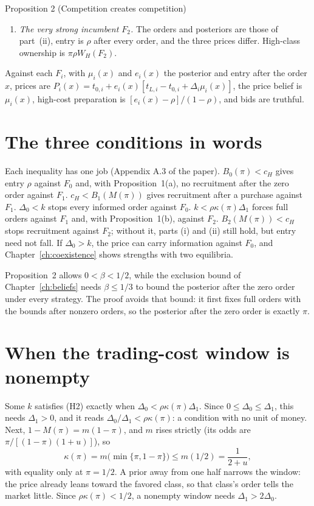 \begin{paperresult}{Proposition 2 (Competition creates competition)}
\begin{enumerate}[label=(\roman*),leftmargin=2em]
  \(W_L(F_0)=0\), that share is one against both incumbents.
\item \emph{The very strong incumbent \(F_2\).} The orders and posteriors are those of part~(ii), entry is \(\rho\)
  after every order, and the three prices differ. High-class ownership is \(\pi\rho W_H(F_2)\).
\end{enumerate}
Against each \(F_i\), with \(\mu_i(x)\) and \(e_i(x)\) the posterior and entry after the order \(x\), prices are
\(P_i(x)=t_{0,i}+e_i(x)[t_{L,i}-t_{0,i}+\Delta_i\mu_i(x)]\), the price belief is \(\mu_i(x)\), high-cost preparation
is \([e_i(x)-\rho]/(1-\rho)\), and bids are truthful.
\end{paperresult}

\section{The three conditions in words}\label{sec:ccc-conditions}

Each inequality has one job (Appendix A.3 of the paper). \(B_0(\pi)<c_H\) gives entry \(\rho\) against \(F_0\) and,
with Proposition~1(a), no recruitment after the zero order against \(F_1\). \(c_H<B_1(M(\pi))\) gives recruitment
after a purchase against \(F_1\). \(\Delta_0<k\) stops every informed order against \(F_0\). \(k<\rho\kappa(\pi)\Delta_1\)
forces full orders against \(F_1\) and, with Proposition~1(b), against \(F_2\). \(B_2(M(\pi))<c_H\) stops recruitment
against \(F_2\); without it, parts (i) and (ii) still hold, but entry need not fall. If \(\Delta_0>k\), the price can carry
information against \(F_0\), and Chapter~\ref{ch:coexistence} shows strengths with two equilibria.

\begin{watchout}
Proposition~2 allows \(0<\beta<1/2\), while the exclusion bound of Chapter~\ref{ch:beliefs} needs \(\beta\le1/3\)
to bound the posterior after the zero order under every strategy. The proof avoids that bound: it first fixes
full orders with the bounds after nonzero orders, so the posterior after the zero order is exactly \(\pi\).
\end{watchout}

\section{When the trading-cost window is nonempty}\label{sec:ccc-window}

Some \(k\) satisfies (H2) exactly when \(\Delta_0<\rho\kappa(\pi)\Delta_1\). Since \(0\le\Delta_0\le\Delta_1\), this
needs \(\Delta_1>0\), and it reads \(\Delta_0/\Delta_1<\rho\kappa(\pi)\): a condition with no unit of money. Next,
\(1-M(\pi)=m(1-\pi)\), and \(m\) rises strictly (its odds are \(\pi/[(1-\pi)(1+u)]\)), so
\[
\kappa(\pi)=m\bigl(\min\{\pi,1-\pi\}\bigr)\le m(1/2)=\frac{1}{2+u},
\]
with equality only at \(\pi=1/2\). A prior away from one half narrows the window: the price already leans toward
the favored class, so that class's order tells the market little. Since \(\rho\kappa(\pi)<1/2\), a nonempty window
needs \(\Delta_1>2\Delta_0\).

